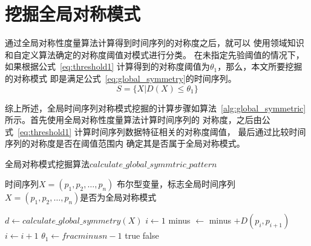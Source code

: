 \section{挖掘全局对称模式}
通过全局对称性度量算法计算得到时间序列的对称度之后，就可以
使用领域知识和自定义算法确定的对称度阈值对模式进行分类。
在未指定先验阈值的情况下，如果根据公式~\ref{eq:threshold1}
计算得到的对称度阈值为$\theta_1$，那么，本文所要挖掘的对称模式
即是满足公式~\ref{eq:global_symmetry}的时间序列。
\begin{equation}
  S = \{X|D(X)\leq\theta_1\}
  \label{eq:global_symmetry}
\end{equation}

综上所述，全局时间序列对称模式挖掘的计算步骤如算法~\ref{alg:global_symmetric}
所示。首先使用全局对称性度量算法计算时间序列的
对称度，之后由公式~\ref{eq:threshold1}
计算时间序列数据特征相关的对称度阈值，
最后通过比较时间序列的对称度是否在阈值范围内
确定其是否属于全局对称模式。

\renewcommand{\algorithmicrequire}{\textbf{输入：}\unskip}
\renewcommand{\algorithmicensure}{\textbf{输出：}\unskip}
\begin{algorithm}
  \caption{全局对称模式挖掘算法$calculate\_global\_symmtric\_pattern$}
  \label{alg:global_symmetric}
  \small
  \begin{algorithmic}
    \REQUIRE 时间序列$X=\left(p_{1}, p_{2}, \dots, p_{n}\right)$
    \ENSURE 布尔型变量，标志全局时间序列$X=\left(p_{1},p_{2},…,p_n \right)$是否为全局对称模式

    \STATE $d \leftarrow calculate\_global\_symmetry(X) $
    \STATE $i \leftarrow 1$
    \STATE minus $\leftarrow$ minus $+D\left(p_{i}, p_{i+1}\right)$
    \STATE $i \leftarrow i+1$
    \ENDWHILE
    \STATE $\theta_1 \leftarrow frac{minus}{n-1}$
      \RETURN true
    \ELSE
      \RETURN false
    \ENDIF
  \end{algorithmic}
\end{algorithm}


